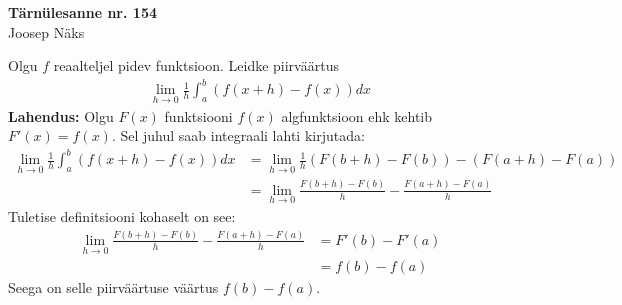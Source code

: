 \documentclass{article}
\begin{document}
\begin{center}
\Large\textbf{T\"arn\"ulesanne nr. 154}\\
\small{Joosep N\"aks}
\end{center}
Olgu $f$ reaalteljel pidev funktsioon. Leidke piirv\"a\"artus
\begin{gather*}
\lim_{h\to0}\frac{1}{h}\int_a^b(f(x+h)-f(x))dx
\end{gather*}
\textbf{Lahendus:} Olgu $F(x)$ funktsiooni $f(x)$ algfunktsioon ehk kehtib $F'(x)=f(x)$. Sel juhul saab integraali lahti kirjutada:
\begin{equation*}
\begin{aligned}
\lim_{h\to0}\frac{1}{h}\int_a^b(f(x+h)-f(x))dx&=\lim_{h\to0}\frac{1}{h}(F(b+h)-F(b))-(F(a+h)-F(a))\\
&=\lim_{h\to0}\frac{F(b+h)-F(b)}{h}-\frac{F(a+h)-F(a)}{h}
\end{aligned}
\end{equation*}
Tuletise definitsiooni kohaselt on see:
\begin{equation*}
\begin{aligned}
\lim_{h\to0}\frac{F(b+h)-F(b)}{h}-\frac{F(a+h)-F(a)}{h}&=F'(b)-F'(a)\\
&=f(b)-f(a)
\end{aligned}
\end{equation*}
Seega on selle piirv\"a\"artuse v\"a\"artus $f(b)-f(a)$.
\end{document}
